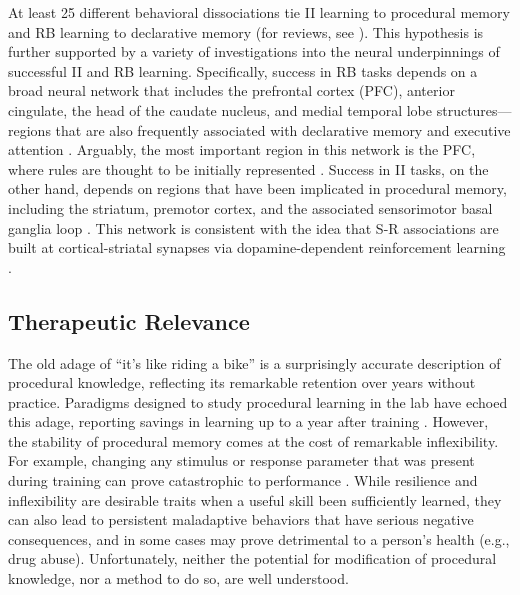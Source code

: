At least 25 different behavioral dissociations tie II learning to procedural
memory and RB learning to declarative memory (for reviews, see
\cite{AshbyMaddox2005,AshbyMaddox2010,AshbyValentin2016}). This hypothesis is
further supported by a variety of investigations into the neural underpinnings
of successful II and RB learning. Specifically, success in RB tasks depends on a
broad neural network that includes the prefrontal cortex (PFC), anterior
cingulate, the head of the caudate nucleus, and medial temporal lobe
structures---regions that are also frequently associated with declarative memory
and executive attention \cite{BrownMarsden1988, FiloteoEtAl2007,
MuhammadWallisMiller2006, SegerCincotta2006}. Arguably, the most important
region in this network is the PFC, where rules are thought to be initially
represented \cite{MillerCohen2001, WallisAndersonMiller2001}. Success in II
tasks, on the other hand, depends on regions that have been implicated in
procedural memory, including the striatum, premotor cortex, and the associated
sensorimotor basal ganglia loop \cite{AshbyEnnis2006,
FiloteoMaddoxSalmonSong2005, KnowltonMangelsSquire1996, NomuraEtAl2007}. This
network is consistent with the idea that S-R associations are built at
cortical-striatal synapses via dopamine-dependent reinforcement learning
\cite{AshbyCrossley2011, HoukAdamsBarto1995, JoelNivRuppin2002}.

\subsection*{Therapeutic Relevance}
The old adage of ``it's like riding a bike'' is a surprisingly accurate
description of procedural knowledge, reflecting its remarkable retention over
years without practice. Paradigms designed to study procedural learning in the
lab have echoed this adage, reporting savings in learning up to a year after
training \cite{Romano2010,turner_long-term_2012}. However, the stability of
procedural memory comes at the cost of remarkable inflexibility. For example,
changing any stimulus or response parameter that was present during training can
prove catastrophic to performance \cite{Rozanov_2010,Dienes_1997}. While
resilience and inflexibility are desirable traits when a useful skill been
sufficiently learned, they can also lead to persistent maladaptive behaviors
that have serious negative consequences, and in some cases may prove detrimental
to a person's health (e.g., drug abuse). Unfortunately, neither the potential
for modification of procedural knowledge, nor a method to do so, are well
understood.

